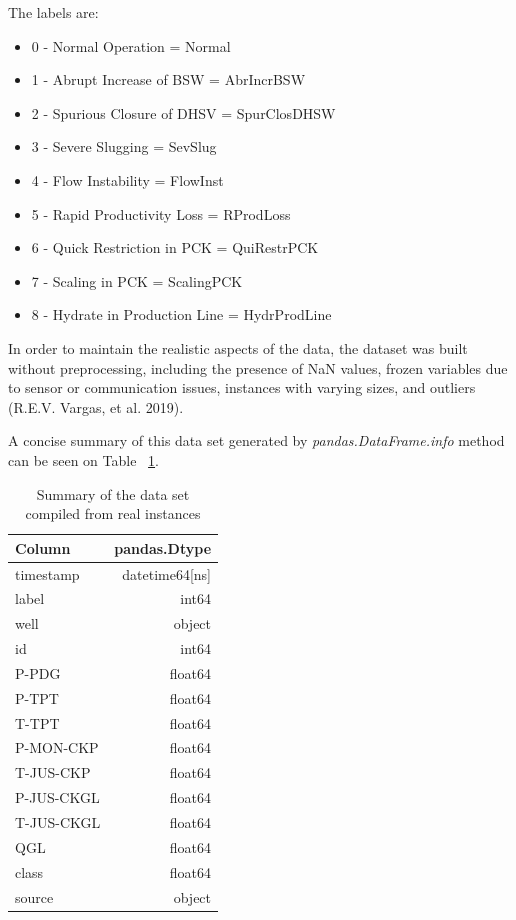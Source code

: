 \documentclass{article}
\begin{document}
The labels are:

\begin{itemize}
\item 0 - Normal Operation = Normal
\item 1 - Abrupt Increase of BSW = AbrIncrBSW
\item 2 - Spurious Closure of DHSV = SpurClosDHSW
\item 3 - Severe Slugging = SevSlug
\item 4 - Flow Instability = FlowInst
\item 5 - Rapid Productivity Loss = RProdLoss
\item 6 - Quick Restriction in PCK = QuiRestrPCK
\item 7 - Scaling in PCK = ScalingPCK
\item 8 - Hydrate in Production Line = HydrProdLine
\end{itemize}

In order to maintain the realistic aspects of the data, the dataset was built without preprocessing, including the presence of NaN values, frozen variables due to sensor or communication issues, instances with varying sizes, and outliers (R.E.V. Vargas, et al. 2019).

A concise summary of this data set generated by \emph{pandas.DataFrame.info} method can be seen on Table ~\ref{tab:widgets}.

\begin{table}
\centering
\begin{tabular}{l|r}

Column & pandas.Dtype \\\hline
timestamp & datetime64[ns] \\
label & int64 \\        
well & object \\       
id & int64 \\        
P-PDG & float64 \\      
P-TPT & float64  \\     
T-TPT & float64 \\      
P-MON-CKP & float64 \\      
T-JUS-CKP & float64 \\      
P-JUS-CKGL & float64\\       
T-JUS-CKGL & float64  \\     
QGL & float64 \\      
class & float64    \\   
source & object \\     

\end{tabular}
\caption{\label{tab:widgets}Summary of the data set compiled from real instances}
\end{table}
\end{document}
